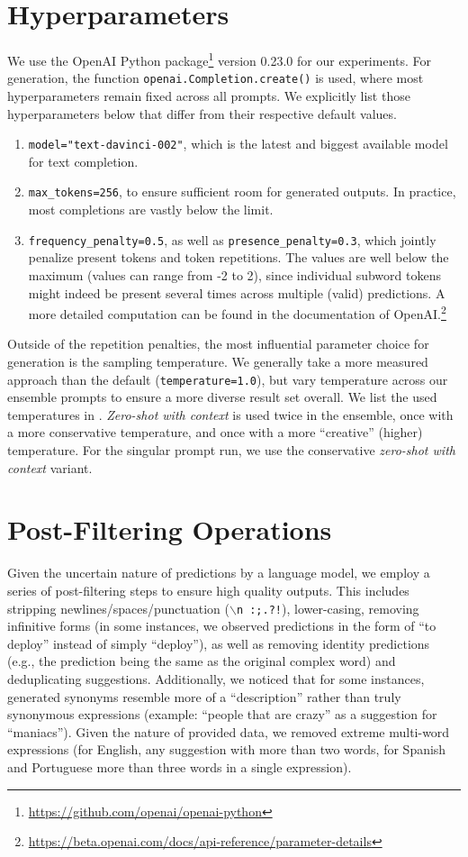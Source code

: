 \documentclass[11pt]{article}
\begin{document}
\section{Hyperparameters}
We use the OpenAI Python package\footnote{\url{https://github.com/openai/openai-python}} version 0.23.0 for our experiments. For generation, the function \texttt{openai.Completion.create()} is used, where most hyperparameters remain fixed across all prompts. We explicitly list those hyperparameters below that differ from their respective default values.
\begin{enumerate}
	\item \texttt{model="text-davinci-002"}, which is the latest and biggest available model for text completion.
	\item \texttt{max\_tokens=256}, to ensure sufficient room for generated outputs. In practice, most completions are vastly below the limit.
	\item \texttt{frequency\_penalty=0.5}, as well as \texttt{presence\_penalty=0.3}, which jointly penalize present tokens and token repetitions. The values are well below the maximum (values can range from -2 to 2), since individual subword tokens might indeed be present several times across multiple (valid) predictions. A more detailed computation can be found in the documentation of OpenAI.\footnote{\url{https://beta.openai.com/docs/api-reference/parameter-details}}
\end{enumerate}

\noindent Outside of the repetition penalties, the most influential parameter choice for generation is the sampling temperature. We generally take a more measured approach than the default (\texttt{temperature=1.0}), but vary temperature across our ensemble prompts to ensure a more diverse result set overall. We list the used temperatures in . \emph{Zero-shot with context} is used twice in the ensemble, once with a more conservative temperature, and once with a more ``creative'' (higher) temperature. For the singular prompt run, we use the conservative \emph{zero-shot with context} variant.

\section{Post-Filtering Operations}
\label{sec:filters}
Given the uncertain nature of predictions by a language model, we employ a series of post-filtering steps to ensure high quality outputs. This includes stripping newlines/spaces/punctuation (\texttt{$\backslash$n :;.?!}), lower-casing, removing infinitive forms (in some instances, we observed predictions in the form of ``to deploy'' instead of simply ``deploy''), as well as removing identity predictions (e.g., the prediction being the same as the original complex word) and deduplicating suggestions. Additionally, we noticed that for some instances, generated synonyms resemble more of a ``description'' rather than truly synonymous expressions (example: ``people that are crazy'' as a suggestion for ``maniacs''). Given the nature of provided data, we removed extreme multi-word expressions (for English, any suggestion with more than two words, for Spanish and Portuguese more than three words in a single expression).
\end{document}
